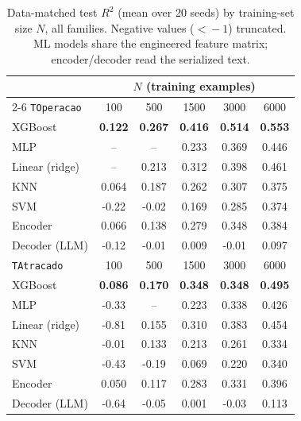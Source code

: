 \documentclass[kdmile,a4paper]{kdmile}
\begin{document}
\begin{table}[t]
\centering
\caption{Data-matched test $R^2$ (mean over 20 seeds) by training-set size $N$, all families. Negative values ($<\!-1$) truncated. ML models share the engineered feature matrix; encoder/decoder read the serialized text.}
\label{tab:datamatched}
\small
\begin{tabular}{@{}lccccc@{}}
\toprule
& \multicolumn{5}{c}{$N$ (training examples)} \\
\cmidrule(lr){2-6}
\texttt{TOperacao} & 100 & 500 & 1500 & 3000 & 6000 \\
\midrule
XGBoost        & \textbf{0.122} & \textbf{0.267} & \textbf{0.416} & \textbf{0.514} & \textbf{0.553} \\
MLP            & --   & --   & 0.233 & 0.369 & 0.446 \\
Linear (ridge) & --   & 0.213 & 0.312 & 0.398 & 0.461 \\
KNN            & 0.064 & 0.187 & 0.262 & 0.307 & 0.375 \\
SVM            & -0.22 & -0.02 & 0.169 & 0.285 & 0.374 \\
Encoder        & 0.066 & 0.138 & 0.279 & 0.348 & 0.384 \\
Decoder (LLM)  & -0.12 & -0.01 & 0.009 & -0.01 & 0.097 \\
\midrule
\texttt{TAtracado} & 100 & 500 & 1500 & 3000 & 6000 \\
\midrule
XGBoost        & \textbf{0.086} & \textbf{0.170} & \textbf{0.348} & \textbf{0.348} & \textbf{0.495} \\
MLP            & -0.33 & --   & 0.223 & 0.338 & 0.426 \\
Linear (ridge) & -0.81 & 0.155 & 0.310 & 0.383 & 0.454 \\
KNN            & -0.01 & 0.133 & 0.213 & 0.261 & 0.334 \\
SVM            & -0.43 & -0.19 & 0.069 & 0.220 & 0.340 \\
Encoder        & 0.050 & 0.117 & 0.283 & 0.331 & 0.396 \\
Decoder (LLM)  & -0.64 & -0.05 & 0.001 & -0.03 & 0.113 \\
\bottomrule
\end{tabular}
\end{table}
\end{document}
